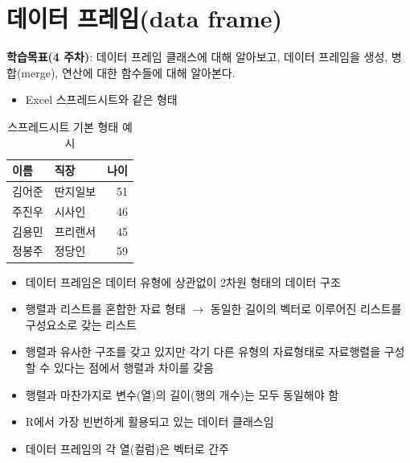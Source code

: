 \documentclass[
  11pt,
]{krantz}
\providecommand{\tightlist}{%
  \setlength{\itemsep}{0pt}\setlength{\parskip}{0pt}}
\let\BeginKnitrBlock\begin \let\EndKnitrBlock\end
\begin{document}
\normalsize

\hypertarget{data-frame}{%
\section{데이터 프레임(data frame)}\label{data-frame}}

\footnotesize

\BeginKnitrBlock{rmdnote}
\textbf{학습목표(4 주차)}: 데이터 프레임 클래스에 대해 알아보고, 데이터 프레임을 생성, 병합(merge), 연산에 대한 함수들에 대해 알아본다.
\EndKnitrBlock{rmdnote}

\normalsize

\begin{itemize}
\tightlist
\item
  Excel 스프레드시트와 같은 형태
\end{itemize}

\footnotesize

\begin{table}

\caption{\label{tab:unnamed-chunk-53}스프레드시트 기본 형태 예시}
\centering
\begin{tabular}[t]{l|l|r}
\hline
이름 & 직장 & 나이\\
\hline
김어준 & 딴지일보 & 51\\
\hline
주진우 & 시사인 & 46\\
\hline
김용민 & 프리랜서 & 45\\
\hline
정봉주 & 정당인 & 59\\
\hline
\end{tabular}
\end{table}

\normalsize

\begin{itemize}
\tightlist
\item
  데이터 프레임은 데이터 유형에 상관없이 2차원 형태의 데이터 구조
\item
  행렬과 리스트를 혼합한 자료 형태 \(\rightarrow\) 동일한 길이의 벡터로 이루어진 리스트를 구성요소로 갖는 리스트
\item
  행렬과 유사한 구조를 갖고 있지만 각기 다른 유형의 자료형태로 자료행렬을 구성할 수 있다는 점에서 행렬과 차이를 갖음
\item
  행렬과 마찬가지로 변수(열)의 길이(행의 개수)는 모두 동일해야 함
\item
  R에서 가장 빈번하게 활용되고 있는 데이터 클래스임
\item
  데이터 프레임의 각 열(컬럼)은 벡터로 간주
\end{itemize}
\end{document}
